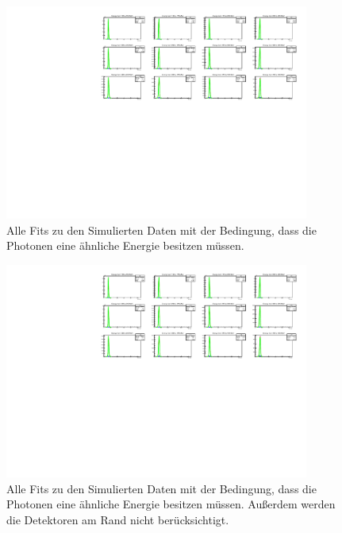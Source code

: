 \documentclass[a4paper,11pt,oneside,final,german,openbib,pdftex]{scrbook}
\begin{document}
{\begin{appendix}
\begin{figure}[h!]
	\begin{center}
		\includegraphics[width=100mm]{20171804NoCutAllFits}
		\caption{Alle Fits zu den Simulierten Daten mit der Bedingung, dass die Photonen eine \"ahnliche Energie besitzen m\"ussen.}
		\label{fig:Sim-No-Cut-All-Fits}
	\end{center}
\end{figure}


\begin{figure}[h!]
	\begin{center}
		\includegraphics[width=100mm]{2017180430DegreeCut}
		\caption{Alle Fits zu den Simulierten Daten mit der Bedingung, dass die Photonen eine \"ahnliche Energie besitzen m\"ussen. Au{\ss}erdem werden die Detektoren am Rand nicht ber\"ucksichtigt.}
		\label{fig:Sim-30-Degree-Cut-All-Fits}
	\end{center}
\end{figure}




\end{appendix}}
\end{document}
